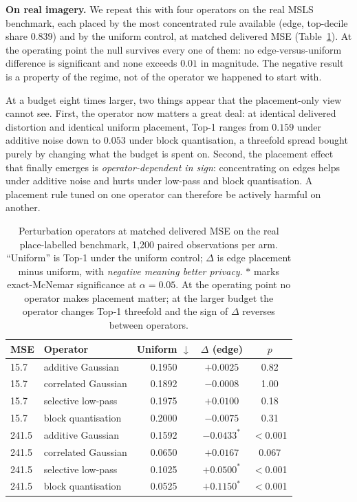 \documentclass[10pt,journal]{IEEEtran}
\begin{document}
\textbf{On real imagery.} We repeat this with four operators on the real MSLS
benchmark, each placed by the most concentrated rule available (edge,
top-decile share $0.839$) and by the uniform control, at matched delivered
MSE (Table~\ref{tab:operator}). At the operating point the null survives every
one of them: no edge-versus-uniform difference is significant and none exceeds
$0.01$ in magnitude. The negative result is a property of the regime, not of
the operator we happened to start with.

At a budget eight times larger, two things appear that the placement-only view
cannot see. First, the operator now matters a great deal: at identical
delivered distortion and identical uniform placement, Top-1 ranges from
$0.159$ under additive noise down to $0.053$ under block quantisation, a
threefold spread bought purely by changing what the budget is spent on.
Second, the placement effect that finally emerges is \emph{operator-dependent
in sign}: concentrating on edges helps under additive noise and hurts under
low-pass and block quantisation. A placement rule tuned on one operator can
therefore be actively harmful on another.

\begin{table}[t]
\centering
\caption{Perturbation operators at matched delivered MSE on the real
place-labelled benchmark, 1,200 paired observations per arm. ``Uniform'' is
Top-1 under the uniform control; $\Delta$ is edge placement minus uniform,
with \emph{negative meaning better privacy}. $\ast$ marks exact-McNemar
significance at $\alpha=0.05$. At the operating point no operator makes
placement matter; at the larger budget the operator changes Top-1 threefold
and the sign of $\Delta$ reverses between operators.}
\label{tab:operator}
\begin{tabular}{llccc}
\hline
MSE & Operator & Uniform $\downarrow$ & $\Delta$ (edge) & $p$ \\
\hline
15.7 & additive Gaussian    & 0.1950 & $+0.0025$ & 0.82 \\
15.7 & correlated Gaussian  & 0.1892 & $-0.0008$ & 1.00 \\
15.7 & selective low-pass   & 0.1975 & $+0.0100$ & 0.18 \\
15.7 & block quantisation   & 0.2000 & $-0.0075$ & 0.31 \\
\hline
241.5 & additive Gaussian   & 0.1592 & $-0.0433^{\ast}$ & $<$0.001 \\
241.5 & correlated Gaussian & 0.0650 & $+0.0167$ & 0.067 \\
241.5 & selective low-pass  & 0.1025 & $+0.0500^{\ast}$ & $<$0.001 \\
241.5 & block quantisation  & 0.0525 & $+0.1150^{\ast}$ & $<$0.001 \\
\hline
\end{tabular}
\end{table}
\end{document}

